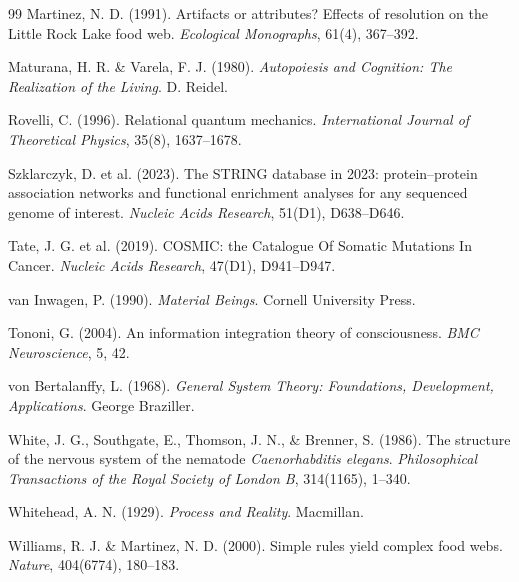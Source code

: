 \documentclass[12pt,a4paper]{article}
\begin{document}
\begin{thebibliography}{99}
Martinez, N. D. (1991). Artifacts or attributes? Effects of resolution on the Little Rock Lake food web. \textit{Ecological Monographs}, 61(4), 367--392.

Maturana, H. R. \& Varela, F. J. (1980). \textit{Autopoiesis and Cognition: The Realization of the Living}. D. Reidel.

Rovelli, C. (1996). Relational quantum mechanics. \textit{International Journal of Theoretical Physics}, 35(8), 1637--1678.

Szklarczyk, D. et al. (2023). The STRING database in 2023: protein--protein association networks and functional enrichment analyses for any sequenced genome of interest. \textit{Nucleic Acids Research}, 51(D1), D638--D646.

Tate, J. G. et al. (2019). COSMIC: the Catalogue Of Somatic Mutations In Cancer. \textit{Nucleic Acids Research}, 47(D1), D941--D947.

van Inwagen, P. (1990). \textit{Material Beings}. Cornell University Press.

Tononi, G. (2004). An information integration theory of consciousness. \textit{BMC Neuroscience}, 5, 42.

von Bertalanffy, L. (1968). \textit{General System Theory: Foundations, Development, Applications}. George Braziller.

White, J. G., Southgate, E., Thomson, J. N., \& Brenner, S. (1986). The structure of the nervous system of the nematode \textit{Caenorhabditis elegans}. \textit{Philosophical Transactions of the Royal Society of London B}, 314(1165), 1--340.

Whitehead, A. N. (1929). \textit{Process and Reality}. Macmillan.

Williams, R. J. \& Martinez, N. D. (2000). Simple rules yield complex food webs. \textit{Nature}, 404(6774), 180--183.

\end{thebibliography}
\end{document}

